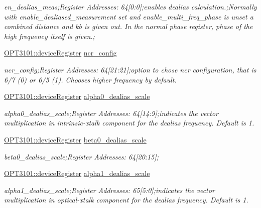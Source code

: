 \begin{DoxyCompactItemize}
\begin{DoxyCompactList}\small\item\em en\+\_\+dealias\+\_\+meas;Register Addresses\+: 64\mbox{[}0\+:0\mbox{]};enables dealias calculation.;Normally with enable\+\_\+dealiased\+\_\+measurement set and enable\+\_\+multi\+\_\+freq\+\_\+phase is unset a combined distance and kb is given out. In the normal phase register, phase of the high frequency itself is given.; \end{DoxyCompactList}\item 
\mbox{\hyperlink{class_o_p_t3101_1_1device_register}{O\+P\+T3101\+::device\+Register}} \mbox{\hyperlink{class_o_p_t3101_1_1registers_a6a2fb5089cb59657163752ab2bc8fd0c}{ncr\+\_\+config}}
\begin{DoxyCompactList}\small\item\em ncr\+\_\+config;Register Addresses\+: 64\mbox{[}21\+:21\mbox{]};option to chose ncr configuration, that is 6/7 (0) or 6/5 (1). Chooses higher frequency by default. \end{DoxyCompactList}\item 
\mbox{\hyperlink{class_o_p_t3101_1_1device_register}{O\+P\+T3101\+::device\+Register}} \mbox{\hyperlink{class_o_p_t3101_1_1registers_a29ac388846dfe0bbbdcee909aeb94b04}{alpha0\+\_\+dealias\+\_\+scale}}
\begin{DoxyCompactList}\small\item\em alpha0\+\_\+dealias\+\_\+scale;Register Addresses\+: 64\mbox{[}14\+:9\mbox{]};indicates the vector multiplication in intrinsic-\/xtalk component for the dealias frequency. Default is \textquotesingle{}1\textquotesingle{}. \end{DoxyCompactList}\item 
\mbox{\hyperlink{class_o_p_t3101_1_1device_register}{O\+P\+T3101\+::device\+Register}} \mbox{\hyperlink{class_o_p_t3101_1_1registers_ad825eb1e8381dd0aa83afcc9eef9c4a2}{beta0\+\_\+dealias\+\_\+scale}}
\begin{DoxyCompactList}\small\item\em beta0\+\_\+dealias\+\_\+scale;Register Addresses\+: 64\mbox{[}20\+:15\mbox{]}; \end{DoxyCompactList}\item 
\mbox{\hyperlink{class_o_p_t3101_1_1device_register}{O\+P\+T3101\+::device\+Register}} \mbox{\hyperlink{class_o_p_t3101_1_1registers_a712fda429e950ee47aa365e4b7dfd1a8}{alpha1\+\_\+dealias\+\_\+scale}}
\begin{DoxyCompactList}\small\item\em alpha1\+\_\+dealias\+\_\+scale;Register Addresses\+: 65\mbox{[}5\+:0\mbox{]};indicates the vector multiplication in optical-\/xtalk component for the dealias frequency. Default is \textquotesingle{}1\textquotesingle{}. \end{DoxyCompactList}\item 

\end{DoxyCompactItemize}
